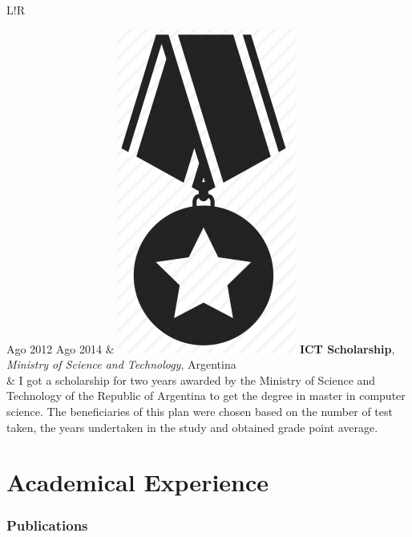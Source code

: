 \documentclass[10pt]{article}
\newcommand\VRule{\color{lightgray}\vrule width 0.5pt}
\begin{document}
\begin{tabular}{L!{\VRule}R}

Ago 2012 Ago 2014 & \includegraphics[scale=0.022]{../img/medal.png}
\textbf{ICT Scholarship}, \textit{Ministry of Science and 
Technology}, Argentina\\
& \vspace{-0.7cm} I got a scholarship for two years awarded by the Ministry of 
Science and Technology of the Republic of Argentina to
get the degree in master in computer science. The beneficiaries of this plan were chosen based on 
the number of test
taken, the years undertaken in the study and obtained grade point average.\\
\end{tabular}



\section*{Academical Experience}

\subsubsection*{Publications}
\end{document}
